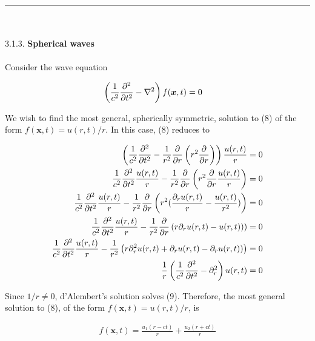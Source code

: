 \documentclass[]{article}
\begin{document}
\noindent\rule{15cm}{0.4pt} \\
\hfill \\

3.1.3. {\bf Spherical waves} \\
\hfill \\

Consider the wave equation

\begin{equation}
\begin{split}
\left( \frac{1}{c^2}\pdv[2]{t} - \laplacian \right) f(\bm{x},t) & = 0
\end{split}
\end{equation}

We wish to find the most general, spherically symmetric, solution to (8) of the form $f(\bm{x},t) = u(r,t)/r$. In this case, (8) reduces to 

\begin{equation}
\begin{split}
\left( \frac{1}{c^2}\pdv[2]{t} -  \frac{1}{r^2} \pdv{r}\left( r^2 \pdv{r} \right)   \right) \frac{u(r,t)}{r} & = 0 \\
\frac{1}{c^2}\pdv[2]{t} \frac{u(r,t)}{r} - \frac{1}{r^2} \pdv{r}\left( r^2 \pdv{r} \frac{u(r,t)}{r}\right) & = 0 \\
\frac{1}{c^2}\pdv[2]{t} \frac{u(r,t)}{r} - \frac{1}{r^2} \pdv{r}\left( r^2 (  \frac{\partial_r u(r,t)}{r}  -  \frac{u(r,t)}{r^2} )\right) & = 0 \\
\frac{1}{c^2}\pdv[2]{t} \frac{u(r,t)}{r} - \frac{1}{r^2} \pdv{r}\left( r \partial_r u(r,t)  -  u(r,t) )\right) & = 0 \\
\frac{1}{c^2}\pdv[2]{t} \frac{u(r,t)}{r} - \frac{1}{r^2} \left(  r \partial_r^2 u(r,t)   +  \partial_r u(r,t)  -   \partial_ru(r,t) )\right) & = 0 \\
\frac{1}{r} \left( \frac{1}{c^2}\pdv[2]{t} - \partial_r^2 \right) u(r,t) & = 0 \\
\end{split}
\end{equation}

Since $1/r \ne 0$,  d’Alembert's solution solves (9). Therefore, the most general solution to (8), of the form $f(\bm{x},t) = u(r,t)/r$, is

\begin{equation}
\begin{split}
f(\bm{x},t) = \frac{u_1(r - ct) }{r} + \frac{u_2(r +  ct) }{r} \\
\end{split}
\end{equation}
\end{document}
